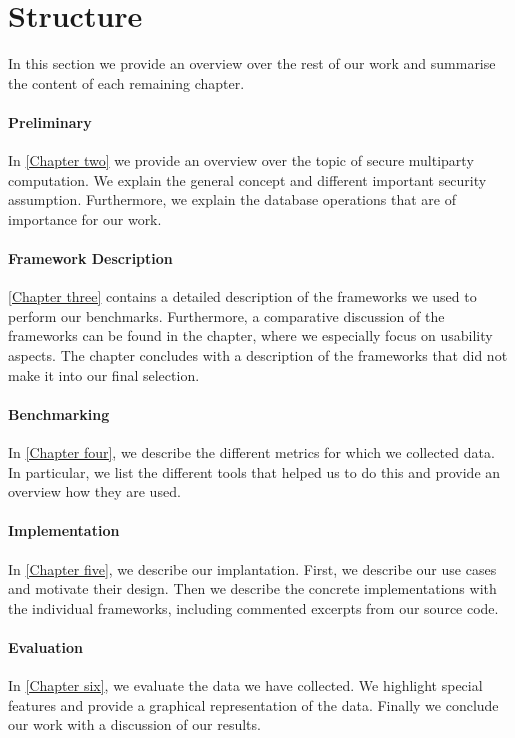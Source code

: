 \section{Structure}
In this section we provide an overview over the rest of our work and summarise the content of each remaining chapter.
\paragraph{Preliminary}

In \hyperref[Preliminary]{[Chapter two]} we provide an overview over the topic of secure multiparty computation. We explain the general concept and different important security assumption. Furthermore, we explain the database operations that are of importance for our work. 
\paragraph{Framework Description}
\hyperref[Framework Desciption]{[Chapter three]} contains a detailed description of the frameworks we used to perform our benchmarks. Furthermore, a comparative discussion of the frameworks can be found in the chapter, where we especially focus on usability aspects. The chapter concludes with a description of the frameworks that did not make it into our final selection. 
\paragraph{Benchmarking}
In \hyperref[Benchmarking]{[Chapter four]}, we describe the different metrics for which we collected data. In particular, we list the different tools that helped us to do this and provide an overview how they are used. 
\paragraph{Implementation}
In \hyperref[Implementation]{[Chapter five]}, we describe our implantation. First, we describe our use cases and motivate their design.  Then we describe the concrete implementations with the individual frameworks, including commented excerpts from our source code.
\paragraph{Evaluation}
In \hyperref[Evaluation]{[Chapter six]}, we evaluate the data we have collected. We highlight special features and provide a graphical representation of the data. 
Finally we conclude our work with a discussion of our results.
